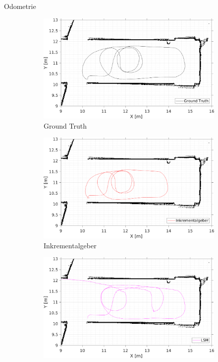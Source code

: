 \documentclass{beamer}
\begin{document}
\begin{frame}{Odometrie}

	\begin{figure}
		\centering
		\begin{subfigure}{0.4\linewidth}
			\centering
			\includegraphics[width=\linewidth]{Record_2018-02-08-12-33-53_trajectory1}
			\caption{Ground Truth}
		\end{subfigure}
		\hfill
		\begin{subfigure}{0.4\linewidth}
			\centering
			\includegraphics[width=\linewidth]{Record_2018-02-08-12-33-53_trajectory2}
			\caption{Inkrementalgeber}
		\end{subfigure}
		\par
		\bigskip
		\begin{subfigure}{0.4\linewidth}
			\centering
			\includegraphics[width=\linewidth]{Record_2018-02-08-12-33-53_trajectory3}

\end{subfigure}
\end{figure}
\end{frame}
\end{document}
